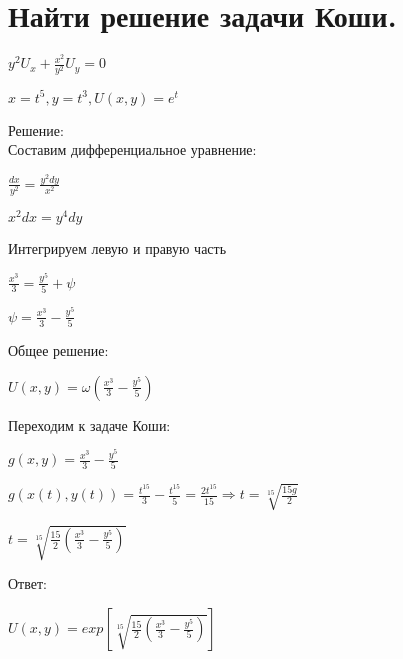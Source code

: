 \documentclass{article}
\begin{document}
	\section{Найти решение задачи Коши.}
	\begin{center}
		$ y^2 U_x + \frac{x^2}{y^2}U_y = 0 $
	\end{center}
	\begin{center}
		$ x = t^5, y = t^3, U(x, y) = e^t $
	\end{center}
	Решение: \\
	Составим дифференциальное уравнение: \\
	\begin{center}
		$\frac{dx}{y^2}=\frac{y^2dy}{x^2}$ \\
	\end{center}
	\begin{center}
		$ x^2dx = y^4dy $
	\end{center}
	Интегрируем левую и правую часть \\
	\begin{center}
		$ \frac{x^3}{3} = \frac{y^5}{5} + \psi $
	\end{center}
	\begin{center}
		$ \psi = \frac{x^3}{3} - \frac{y^5}{5} $
	\end{center}
	Общее решение: \\
	\begin{center}
		$ U(x, y) = \omega(\frac{x^3}{3} - \frac{y^5}{5}) $
	\end{center}
	Переходим к задаче Коши: \\
	\begin{center}
		$ g(x, y) = \frac{x^3}{3} - \frac{y^5}{5} $
	\end{center}
	\begin{center}
		$ g(x(t), y(t)) = \frac{t^15}{3} - \frac{t^15}{5} = \frac{2t^15}{15} \Rightarrow t = \sqrt[15]{\frac{15g}{2}} $
	\end{center}
	\begin{center}
		$ t = \sqrt[15]{\frac{15}{2} (\frac{x^3}{3} - \frac{y^5}{5})} $
	\end{center}
	Ответ:
	\begin{center}
		$ U(x, y) = exp[\sqrt[15]{\frac{15}{2} (\frac{x^3}{3} - \frac{y^5}{5})}] $
	\end{center}

	\newpage
\end{document}
